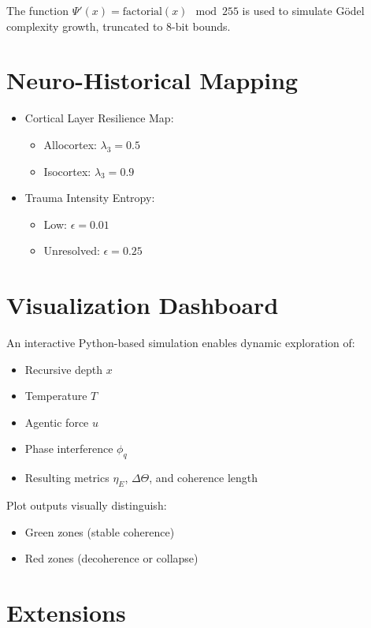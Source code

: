 \documentclass[11pt]{article}
\begin{document}
The function \( \Psi'(x) = \text{factorial}(x) \mod 255 \) is used to simulate Gödel complexity growth, truncated to 8-bit bounds.

\section{Neuro-Historical Mapping}

\begin{itemize}
  \item Cortical Layer Resilience Map:
    \begin{itemize}
      \item Allocortex: \( \lambda_3 = 0.5 \)
      \item Isocortex: \( \lambda_3 = 0.9 \)
    \end{itemize}
  \item Trauma Intensity Entropy:
    \begin{itemize}
      \item Low: \( \epsilon = 0.01 \)
      \item Unresolved: \( \epsilon = 0.25 \)
    \end{itemize}
\end{itemize}

\section{Visualization Dashboard}

An interactive Python-based simulation enables dynamic exploration of:

\begin{itemize}
  \item Recursive depth \( x \)
  \item Temperature \( T \)
  \item Agentic force \( u \)
  \item Phase interference \( \phi_q \)
  \item Resulting metrics \( \eta_E \), \( \Delta\Theta \), and coherence length
\end{itemize}

Plot outputs visually distinguish:
\begin{itemize}
  \item Green zones (stable coherence)
  \item Red zones (decoherence or collapse)
\end{itemize}

\section{Extensions}
\end{document}
